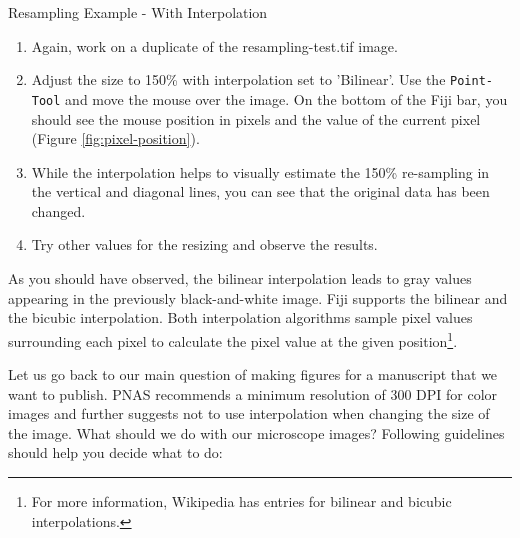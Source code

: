 \begin{taskbox}{Resampling Example - With Interpolation}

\begin{enumerate}
	\item Again, work on a duplicate of the resampling-test.tif image.
	\item Adjust the size to 150\% with interpolation set to 'Bilinear'. Use the \texttt{Point-Tool} and move the mouse over the image. On the bottom of the Fiji bar, you should see the mouse position in pixels and the value of the current pixel (Figure \ref{fig:pixel-position}).
	
	\begin{minipage}[t]{\linewidth}
		\begin{center}
		\medskip
		\label{fig:pixel-position}
		\end{center}
	\end{minipage}
	
	\item While the interpolation helps to visually estimate the 150\% re-sampling in the vertical and diagonal lines, you can see that the original data has been changed.
	\item Try other values for the resizing and observe the results.
\end{enumerate}
\end{taskbox}

As you should have observed, the bilinear interpolation leads to gray values appearing in the previously black-and-white image. Fiji supports the bilinear and the bicubic interpolation. Both interpolation algorithms sample pixel values surrounding each pixel to calculate the pixel value at the given position\footnote{For more information, Wikipedia has entries for bilinear and bicubic interpolations.}. 

Let us go back to our main question of making figures for a manuscript that we want to publish. PNAS recommends a minimum resolution of 300 DPI for color images and further suggests not to use interpolation when changing the size of the image. What should we do with our microscope images? Following guidelines should help you decide what to do:

